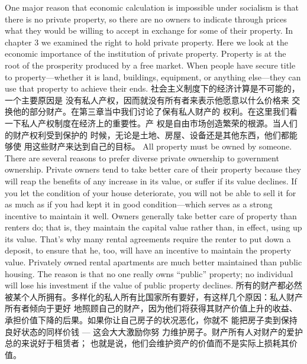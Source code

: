 \begin{paracol}{2}
One major reason that economic calculation is impossible under
socialism is that there is no private property, so there are no
owners to indicate through prices what they would be willing
to accept in exchange for some of their property. In chapter 3
we examined the right to hold private property. Here we look at
the economic importance of the institution of private property.
Property is at the root of the prosperity produced by a free market. When people have secure title to property---whether it is
land, buildings, equipment, or anything else---they can use
that property to achieve their ends.
\switchcolumn
社会主义制度下的经济计算是不可能的，一个主要原因是
没有私人产权，因而就没有所有者来表示他愿意以什么价格来
交换他的部分财产。在第三章当中我们讨论了保有私人财产的
权利。在这里我们看一下私人产权制度在经济上的重要性。产
权是自由市场创造繁荣的根源。当人们的财产权利受到保护的
时候，无论是土地、房屋、设备还是其他东西，他们都能够使
用这些财产来达到自己的目标。
\switchcolumn*
All property must be owned by someone. There are several reasons to prefer diverse private ownership to government ownership. Private owners tend to take better care of their property
because they will reap the benefits of any increase in its value, or
suffer if its value declines. If you let the condition of your house
deteriorate, you will not be able to sell it for as much as if you
had kept it in good condition---which serves as a strong incentive to maintain it well. Owners generally take better care of
property than renters do; that is, they maintain the capital
value rather than, in effect, using up its value. That's why many
rental agreements require the renter to put down a deposit, to
ensure that he, too, will have an incentive to maintain the property value. Privately owned rental apartments are much better
maintained than public housing. The reason is that no one really owns ``public'' property; no individual will lose his investment if the value of public property declines.
\switchcolumn
所有的财产都必然被某个人所拥有。多样化的私人所有比国家所有要好，有这样几个原因：私人财产所有者倾向于更好
地照顾自己的财产，因为他们将获得其财产价值上升的收益、
承担价值下降的后果。如果你让自己房子的状况恶化，你就不
能把房子卖到保持良好状态的同样价钱 --- 这会大大激励你努
力维护房子。财产所有人对财产的爱护总的来说好于租赁者；
也就是说，他们会维护资产的价值而不是实际上损耗其价值。

\end{paracol}
